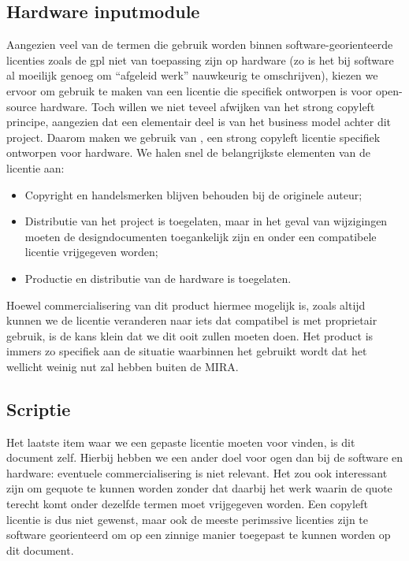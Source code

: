 \subsection{Hardware inputmodule}

Aangezien veel van de termen die gebruik worden binnen software-georienteerde licenties zoals de \ac{gpl} niet van toepassing zijn op hardware (zo is het bij software al moeilijk genoeg om ``afgeleid werk'' nauwkeurig te omschrijven), kiezen we ervoor om gebruik te maken van een licentie die specifiek ontworpen is voor open-source hardware. Toch willen we niet teveel afwijken van het strong copyleft principe, aangezien dat een elementair deel is van het business model achter dit project. Daarom maken we gebruik van , een strong copyleft licentie specifiek ontworpen voor hardware. We halen snel de belangrijkste elementen van de licentie aan:

\begin{itemize}
  \item Copyright en handelsmerken blijven behouden bij de originele auteur;
  \item Distributie van het project is toegelaten, maar in het geval van wijzigingen moeten de designdocumenten toegankelijk zijn en onder een compatibele licentie vrijgegeven worden;
  \item Productie en distributie van de hardware is toegelaten.
\end{itemize}

Hoewel commercialisering van dit product hiermee mogelijk is, zoals altijd kunnen we de licentie veranderen naar iets dat compatibel is met proprietair gebruik, is de kans klein dat we dit ooit zullen moeten doen. Het product is immers zo specifiek aan de situatie waarbinnen het gebruikt wordt dat het wellicht weinig nut zal hebben buiten de MIRA.

\subsection{Scriptie}

Het laatste item waar we een gepaste licentie moeten voor vinden, is dit document zelf. Hierbij hebben we een ander doel voor ogen dan bij de software en hardware: eventuele commercialisering is niet relevant. Het zou ook interessant zijn om gequote te kunnen worden zonder dat daarbij het werk waarin de quote terecht komt onder dezelfde termen moet vrijgegeven worden. Een copyleft licentie is dus niet gewenst, maar ook de meeste perimssive licenties zijn te software georienteerd om op een zinnige manier toegepast te kunnen worden op dit document.

